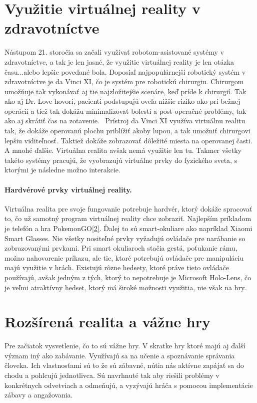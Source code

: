 \documentclass[10pt,twoside,a4paper]{article}
\begin{document}
\section{Využitie virtuálnej reality v zdravotníctve} \label{zdravotnictvo}
Nástupom 21. storočia sa začali využívať robotom-asistované systémy v zdravotníctve, a tak je len jasné, že využitie virtuálnej reality je len otázka času...alebo lepšie povedané bola. Doposiaľ najpopulárnejší robotický systém v zdravotníctve je da Vinci XI, čo je systém pre robotickú chirurgiu. Chirurgom umožňuje tak vykonávať aj tie najzložitejšie scenáre, keď príde k chirurgií. Tak ako aj Dr. Love hovorí, pacienti podstupujú oveľa nižšie riziko ako pri bežnej operácií a tiež tak dokážu minimalizovať bolesti a post-operačné problémy, tak ako aj skrátiť čas na zotavenie.~\cite{XiRobots}
Prístroj da Vinci XI využíva virtuálnu realitu tak, že dokáže operovanú plochu priblížiť akoby lupou, a tak umožniť chirurgovi lepšiu viditeľnosť. Taktiež dokáže zobrazovať dôležité miesta na operovanej časti. A mnohé ďalšie. Virtuálna realita avšak nemá využitie len tu. Takmer všetky takéto systémy pracujú, že vyobrazujú virtuálne prvky do fyzického sveta, s ktorými je následne možno interakcie. 

\paragraph{Hardvérové prvky virtuálnej reality.}
Virtuálna realita pre svoje fungovanie potrebuje hardvér, ktorý dokáže spracovať to, čo už samotný program virtuálnej reality chce zobraziť. Najlepším príkladom je telefón a hra PokemonGO\ref{2}. Ďalej to sú smart-okuliare ako napríklad Xiaomi Smart Glasses. Nie všetky nositeľné prvky vyžadujú ovládače pre narábanie so zobrazovanými prvkami. Pri smart okuliaroch stačia gestá, poťukanie rámu, možno nahovorenie príkazu, ale tie, ktoré potrebujú ovládače pre manipuláciu majú využitie v hrách. Existujú rôzne hedsety, ktoré práve tieto ovládače používajú, avšak jedným z tých, ktorý to nepotrebuje je Microsoft Holo-Lens, čo je veľmi atraktívny hedset, ktorý má široké možnosti využitia, nie však na hry.



\section{Rozšírená realita a vážne hry} \label{vz}
Pre začiatok vysvetlenie, čo to sú vážne hry. V skratke hry ktoré majú aj ďalší význam iný ako zabávanie. Využívajú sa na učenie a spoznávanie správania človeka. Ich vlastnosťami sú to že sú zábavné, nútia nás aktívne zapájať sa do chodu a pohlcujú jednotlivca. Sú navrhnuté tak aby riešili problémy v konkrétnych odvetviach a odmeňujú, a vyzývajú hráča s pomocou implementácie zábavy a angažovania.
\end{document}

